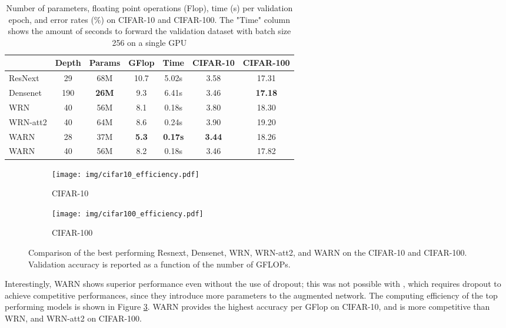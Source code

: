 \documentclass[runningheads]{llncs}
\begin{document}
\begin{table}[t!]
\centering
\caption{Number of parameters, floating point operations (Flop), time (s) per validation epoch, and error rates (\%) on CIFAR-10 and CIFAR-100. The "Time" column shows the amount of seconds to forward the validation dataset with batch size 256 on a single GPU}
\label{tab:performance_benchmark}
\begin{tabular}{@{}lcccccc@{}}
\toprule
 & \textbf{Depth} & \textbf{Params} & \textbf{GFlop} & \textbf{Time} & \textbf{CIFAR-10} & \textbf{CIFAR-100} \\ \midrule
ResNext & 29 & 68M & 10.7 & 5.02s & 3.58 & 17.31 \\
Densenet & 190 & \textbf{26M} & 9.3 & 6.41s & 3.46 & \textbf{17.18}\\
WRN & 40 & 56M & 8.1 & 0.18s & 3.80 & 18.30\\ 
WRN-att2 & 40 & 64M & 8.6 & 0.24s & 3.90 & 19.20\\ \midrule
WARN & 28 & 37M & \textbf{5.3} & \textbf{0.17s} & \textbf{3.44} & 18.26\\ 
WARN & 40 & 56M & 8.2 & 0.18s & 3.46 & 17.82\\\bottomrule
\end{tabular}
\end{table}

\begin{figure}[!t]
\centering
\begin{subfigure}[!t]{0.45\textwidth}
\centering
\texttt{[image: img/cifar10\_efficiency.pdf]}
\caption{CIFAR-10}
\label{fig:clutter_mnist}
\end{subfigure}
\begin{subfigure}[!t]{0.45\textwidth}
\centering
\texttt{[image: img/cifar100\_efficiency.pdf]}
\caption{CIFAR-100}
\label{fig:clutter_mnist}
\end{subfigure}
\caption{Comparison of the best performing Resnext, Densenet, WRN, WRN-att2, and WARN on the CIFAR-10 and CIFAR-100. Validation accuracy is reported as a function of the number of GFLOPs.}
\label{fig:efficiency}
\end{figure}

Interestingly, WARN shows superior performance even without the use of dropout; this was not possible with \cite{jetley2018learn}, which requires dropout to achieve competitive performances, since they introduce more parameters to the augmented network. The computing efficiency of the top performing models is shown in Figure \ref{fig:efficiency}. WARN provides the highest accuracy per GFlop on CIFAR-10, and is more competitive than WRN, and WRN-att2 on CIFAR-100.
\end{document}
